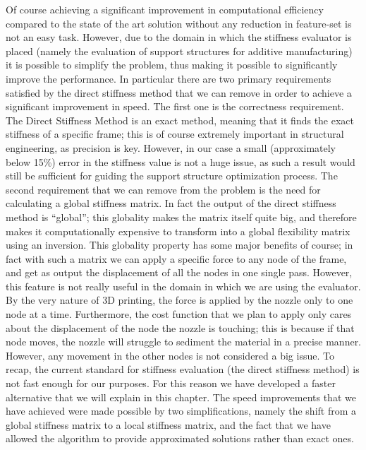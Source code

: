Of course achieving a significant improvement in computational efficiency compared
to the state of the art solution without any reduction in feature-set is not an easy task.
However, due to the domain in which the stiffness evaluator is placed (namely the evaluation
of support structures for additive manufacturing) it is possible to simplify the problem,
thus making it possible to significantly improve the performance.
In particular there are two primary requirements satisfied by the direct stiffness method
that we can remove in order to achieve a significant improvement in speed.
The first one is the correctness requirement. The Direct Stiffness Method is an exact method,
meaning that it finds the exact stiffness of a specific frame; this is of course extremely
important in structural engineering, as precision is key. However, in our case a small
(approximately below 15\%) error in the stiffness value is not a huge issue, as such
a result would still be sufficient for guiding the support structure optimization process.
The second requirement that we can remove from the problem is the need for calculating
a global stiffness matrix.
In fact the output of the direct stiffness method is ``global'';
this globality makes the matrix itself quite big, and therefore makes it computationally
expensive to transform into a global flexibility matrix using an inversion.
This globality property has some major benefits of course; in fact with such a matrix
we can apply a specific force to any node of the frame, and get as output the displacement
of all the nodes in one single pass.
However, this feature is not really useful in the domain in which we are using the evaluator.
By the very nature of 3D printing, the force is applied by the nozzle only to one node at a time.
Furthermore, the cost function that we plan to apply only cares about the displacement of the node
the nozzle is touching; this is because if that node moves, the nozzle will struggle to sediment the material
in a precise manner. However, any movement in the other nodes is not considered a big issue.
To recap, the current standard for stiffness evaluation (the direct stiffness method) is not fast enough
for our purposes. For this reason we have developed a faster alternative that we will explain in this chapter.
The speed improvements that we have achieved were made possible by two simplifications, namely
the shift from a global stiffness matrix to a local stiffness matrix, and the fact that we have
allowed the algorithm to provide approximated solutions rather than exact ones.

